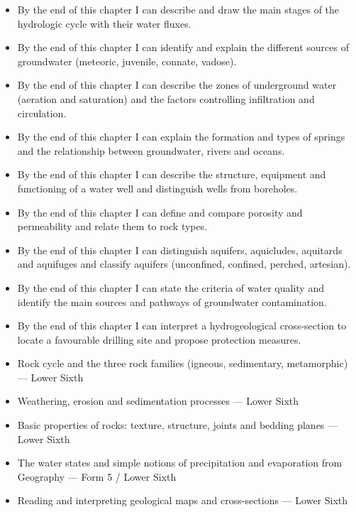 \documentclass[11pt]{article}
\begin{document}
\begin{objectifs}
\begin{itemize}
\item By the end of this chapter I can describe and draw the main stages of the hydrologic cycle with their water fluxes.
\item By the end of this chapter I can identify and explain the different sources of groundwater (meteoric, juvenile, connate, vadose).
\item By the end of this chapter I can describe the zones of underground water (aeration and saturation) and the factors controlling infiltration and circulation.
\item By the end of this chapter I can explain the formation and types of springs and the relationship between groundwater, rivers and oceans.
\item By the end of this chapter I can describe the structure, equipment and functioning of a water well and distinguish wells from boreholes.
\item By the end of this chapter I can define and compare porosity and permeability and relate them to rock types.
\item By the end of this chapter I can distinguish aquifers, aquicludes, aquitards and aquifuges and classify aquifers (unconfined, confined, perched, artesian).
\item By the end of this chapter I can state the criteria of water quality and identify the main sources and pathways of groundwater contamination.
\item By the end of this chapter I can interpret a hydrogeological cross-section to locate a favourable drilling site and propose protection measures.
\end{itemize}
\end{objectifs}

\begin{prerequis}
\begin{itemize}
\item Rock cycle and the three rock families (igneous, sedimentary, metamorphic) — Lower Sixth
\item Weathering, erosion and sedimentation processes — Lower Sixth
\item Basic properties of rocks: texture, structure, joints and bedding planes — Lower Sixth
\item The water states and simple notions of precipitation and evaporation from Geography — Form 5 / Lower Sixth
\item Reading and interpreting geological maps and cross-sections — Lower Sixth
\end{itemize}
\end{prerequis}
\end{document}
